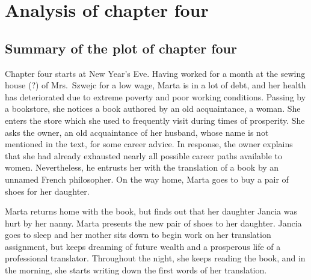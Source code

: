 \section{Analysis of chapter four}

\subsection{Summary of the plot of chapter four}

Chapter four starts at New Year's Eve.
Having worked for a month at the sewing house (?) of Mrs.\ Szwejc for a low wage, Marta is in a lot of debt, and her health has deteriorated due to extreme poverty and poor working conditions.
Passing by a bookstore, she notices a book authored by an old acquaintance, a woman.
She enters the store which she used to frequently visit during times of prosperity.
She asks the owner, an old acquaintance of her husband, whose name is not mentioned in the text, for some career advice.
In response, the owner explains that she had already exhausted nearly all possible career paths available to women.
Nevertheless, he entrusts her with the translation of a book by an unnamed French philosopher.
On the way home, Marta goes to buy a pair of shoes for her daughter.

Marta returns home with the book, but finds out that her daughter Jancia was hurt by her nanny.
Marta presents the new pair of shoes to her daughter.
Jancia goes to sleep and her mother sits down to begin work on her translation assignment, but keeps dreaming of future wealth and a prosperous life of a professional translator.
Throughout the night, she keeps reading the book, and in the morning, she starts writing down the first words of her translation.
